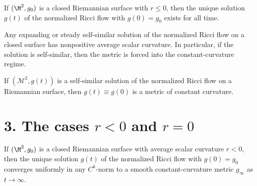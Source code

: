 \begin{proposition}
\label{ch05-prop-long-time-existence-nonpositive}

If \((\M^2,g_0)\) is a closed Riemannian surface with \(r\le 0\), then the unique solution \(g(t)\) of the normalized Ricci flow with \(g(0)=g_0\) exists for all time.
\end{proposition}

\begin{proposition}
\label{ch05-prop-self-similar-solutions-constant-curvature}

Any expanding or steady self-similar solution of the normalized Ricci flow on a closed surface has nonpositive average scalar curvature. In particular, if the solution is self-similar, then the metric is forced into the constant-curvature regime.
\end{proposition}

\begin{proposition}
\label{ch05-prop-self-similar-constant-curvature}

If \((\mathcal{M}^2,g(t))\) is a self-similar solution of the normalized Ricci flow on a Riemannian surface, then \(g(t)\equiv g(0)\) is a metric of constant curvature.
\end{proposition}

\section*{3. The cases \(r<0\) and \(r=0\)}

\begin{theorem}
\label{ch05-thm-negative-average-curvature}

If \((\M^2,g_0)\) is a closed Riemannian surface with average scalar curvature \(r<0\), then the unique solution \(g(t)\) of the normalized Ricci flow with \(g(0)=g_0\) converges uniformly in any \(C^k\)-norm to a smooth constant-curvature metric \(g_\infty\) as \(t\to\infty\).
\end{theorem}

